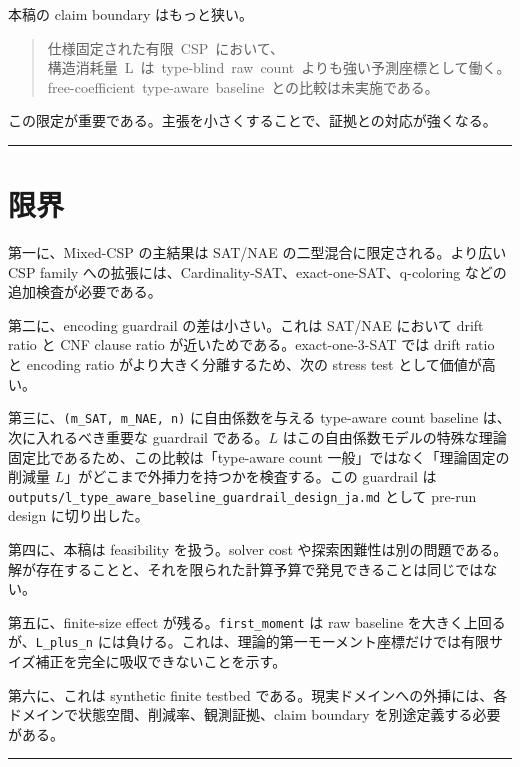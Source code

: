 \documentclass[12pt,a4paper]{article}
\begin{document}
本稿の claim boundary はもっと狭い。

\begin{quote}
{\small\ttfamily\noindent
仕様固定された有限~CSP~において、 \\構造消耗量~L~は~type-blind~raw~count~よりも強い予測座標として働く。 \\free-coefficient~type-aware~baseline~との比較は未実施である。
}
\end{quote}

この限定が重要である。主張を小さくすることで、証拠との対応が強くなる。

\begin{center}\rule{0.5\linewidth}{0.5pt}\end{center}

\section{限界}\label{ux9650ux754c}

第一に、Mixed-CSP の主結果は SAT/NAE の二型混合に限定される。より広い CSP family への拡張には、Cardinality-SAT、exact-one-SAT、q-coloring などの追加検査が必要である。

第二に、encoding guardrail の差は小さい。これは SAT/NAE において drift ratio と CNF clause ratio が近いためである。exact-one-3-SAT では drift ratio と encoding ratio がより大きく分離するため、次の stress test として価値が高い。

第三に、\texttt{(m\_SAT,\ m\_NAE,\ n)} に自由係数を与える type-aware count baseline は、次に入れるべき重要な guardrail である。$L$ はこの自由係数モデルの特殊な理論固定比であるため、この比較は「type-aware count 一般」ではなく「理論固定の削減量 $L$」がどこまで外挿力を持つかを検査する。この guardrail は \texttt{outputs/l\_type\_aware\_baseline\_guardrail\_design\_ja.md} として pre-run design に切り出した。

第四に、本稿は feasibility を扱う。solver cost や探索困難性は別の問題である。解が存在することと、それを限られた計算予算で発見できることは同じではない。

第五に、finite-size effect が残る。\texttt{first\_moment} は raw baseline を大きく上回るが、\texttt{L\_plus\_n} には負ける。これは、理論的第一モーメント座標だけでは有限サイズ補正を完全に吸収できないことを示す。

第六に、これは synthetic finite testbed である。現実ドメインへの外挿には、各ドメインで状態空間、削減率、観測証拠、claim boundary を別途定義する必要がある。

\begin{center}\rule{0.5\linewidth}{0.5pt}\end{center}
\end{document}
